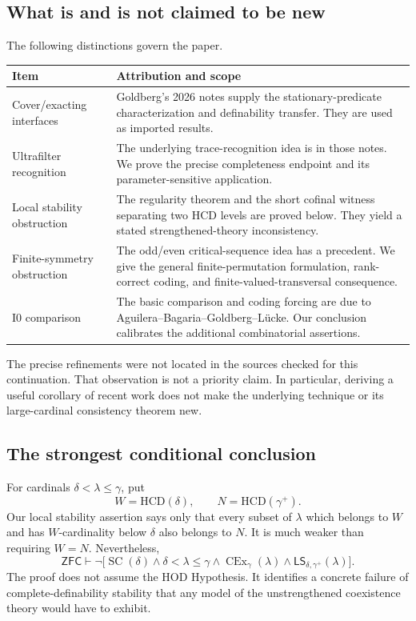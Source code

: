 \documentclass[11pt,letterpaper]{article}
\theoremstyle{definition}
\newcommand{\ZFC}{\mathsf{ZFC}}
\newcommand{\SC}{\operatorname{SC}}
\newcommand{\CEx}{\operatorname{CEx}}
\newcommand{\Izero}{\mathrm{I0}}
\newcommand{\HCD}{\mathrm{HCD}}
\newcommand{\LS}{\mathsf{LS}}
\begin{document}
\subsection{What is and is not claimed to be new}

The following distinctions govern the paper.

\begin{center}
\small
\renewcommand{\arraystretch}{1.16}
\begin{tabularx}{\textwidth}{@{}P{.25\textwidth}Y@{}}
\toprule
\textbf{Item}&\textbf{Attribution and scope}\\\midrule
Cover/exacting interfaces & Goldberg's 2026 notes supply the stationary-predicate characterization and definability transfer. They are used as imported results.\\[4pt]
Ultrafilter recognition & The underlying trace-recognition idea is in those notes. We prove the precise completeness endpoint and its parameter-sensitive application.\\[4pt]
Local stability obstruction & The regularity theorem and the short cofinal witness separating two $\HCD$ levels are proved below. They yield a stated strengthened-theory inconsistency.\\[4pt]
Finite-symmetry obstruction & The odd/even critical-sequence idea has a precedent. We give the general finite-permutation formulation, rank-correct coding, and finite-valued-transversal consequence.\\[4pt]
$\Izero$ comparison & The basic comparison and coding forcing are due to Aguilera--Bagaria--Goldberg--L\"ucke. Our conclusion calibrates the additional combinatorial assertions.\\
\bottomrule
\end{tabularx}
\end{center}

The precise refinements were not located in the sources checked for this continuation. That observation is not a priority claim. In particular, deriving a useful corollary of recent work does not make the underlying technique or its large-cardinal consistency theorem new.

\subsection{The strongest conditional conclusion}

For cardinals $\delta<\lambda\leq\gamma$, put
\[
 W=\HCD(\delta),\qquad N=\HCD(\gamma^+).
\]
Our local stability assertion says only that every subset of $\lambda$ which belongs to $W$ and has $W$-cardinality below $\delta$ also belongs to $N$. It is much weaker than requiring $W=N$. Nevertheless,
\begin{equation}\label{eq:headline-inconsistency}
 \ZFC\vdash
 \neg\bigl[\SC(\delta)\wedge\delta<\lambda\leq\gamma
       \wedge\CEx_\gamma(\lambda)
       \wedge\LS_{\delta,\gamma^+}(\lambda)\bigr].
\end{equation}
The proof does not assume the HOD Hypothesis. It identifies a concrete failure of complete-definability stability that any model of the unstrengthened coexistence theory would have to exhibit.
\end{document}
